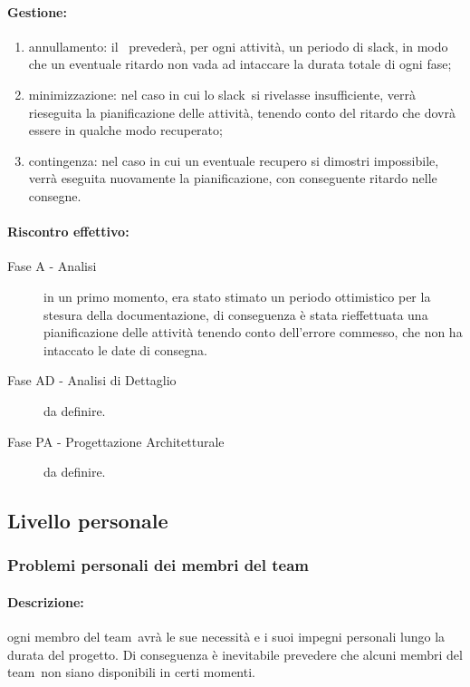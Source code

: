 \documentclass[../PianoProgetto.tex]{subfiles}
\begin{document}
	\paragraph*{Gestione:}
	\begin{enumerate}
		\item annullamento: il \responsabilediprogetto\ prevederà, per ogni attività, un periodo di slack\g, in modo che un eventuale ritardo non vada ad intaccare la durata totale di ogni fase\g ;
		\item minimizzazione: nel caso in cui lo slack\g\ si rivelasse insufficiente, verrà rieseguita la pianificazione delle attività, tenendo conto del ritardo che dovrà essere in qualche modo recuperato;
		\item contingenza: nel caso in cui un eventuale recupero si dimostri impossibile, verrà eseguita nuovamente la pianificazione, con conseguente ritardo nelle consegne.
	\end{enumerate}	
	
	\paragraph*{Riscontro effettivo:} 
		\begin{description}
			\item[Fase A - Analisi] in un primo momento, era stato stimato un periodo ottimistico per la stesura della documentazione, di conseguenza è stata rieffettuata una pianificazione delle attività tenendo conto dell'errore commesso, che non ha intaccato le date di consegna.
			\item[Fase AD - Analisi di Dettaglio] da definire.
			\item[Fase PA - Progettazione Architetturale] da definire.
		\end{description}
		

\subsection{Livello personale}

\subsubsection{Problemi personali dei membri del team}

	\paragraph*{Descrizione:} ogni membro del team\g\ avrà le sue necessità e i suoi impegni personali lungo la durata del progetto. Di conseguenza è inevitabile prevedere che alcuni membri del team\g\ non siano disponibili in certi momenti.
	 
\end{document}

